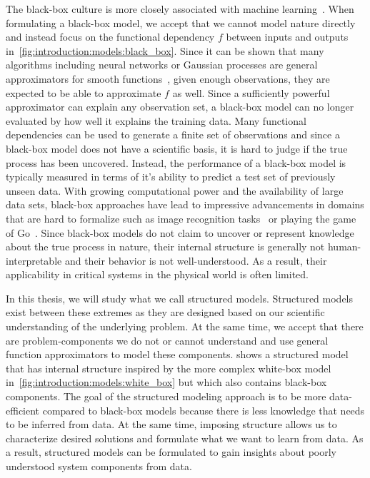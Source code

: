 The black-box culture is more closely associated with machine learning~\parencite{mitchell_machine_1997,goodfellow_deep_2016}.
When formulating a black-box model, we accept that we cannot model nature directly and instead focus on the functional dependency $f$ between inputs and outputs in~\cref{fig:introduction:models:black_box}.
Since it can be shown that many algorithms including neural networks or Gaussian processes are general approximators for smooth functions~\parencite{rasmussen_gaussian_2006}, given enough observations, they are expected to be able to approximate $f$ as well.
Since a sufficiently powerful approximator can explain any observation set, a black-box model can no longer evaluated by how well it explains the training data.
Many functional dependencies can be used to generate a finite set of observations and since a black-box model does not have a scientific basis, it is hard to judge if the true process has been uncovered.
Instead, the performance of a black-box model is typically measured in terms of it's ability to predict a test set of previously unseen data.
With growing computational power and the availability of large data sets, black-box approaches have lead to impressive advancements in domains that are hard to formalize such as image recognition tasks~\parencite{lecun_backpropagation_1989} or playing the game of Go~\parencite{silver_mastering_2016}.
Since black-box models do not claim to uncover or represent knowledge about the true process in nature, their internal structure is generally not human-interpretable and their behavior is not well-understood.
As a result, their applicability in critical systems in the physical world is often limited.

In this thesis, we will study what we call structured models.
Structured models exist between these extremes as they are designed based on our scientific understanding of the underlying problem.
At the same time, we accept that there are problem-components we do not or cannot understand and use general function approximators to model these components.
 shows a structured model that has internal structure inspired by the more complex white-box model in~\cref{fig:introduction:models:white_box} but which also contains black-box components.
The goal of the structured modeling approach is to be more data-efficient compared to black-box models because there is less knowledge that needs to be inferred from data.
At the same time, imposing structure allows us to characterize desired solutions and formulate what we want to learn from data.
As a result, structured models can be formulated to gain insights about poorly understood system components from data.

